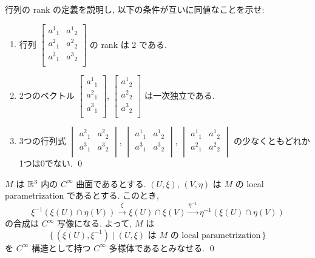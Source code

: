 \documentclass[12pt,twoside]{jarticle}
\def\R{{\Bbb R}} %
\begin{document}
\begin{question}
  行列の rank の定義を説明し, 以下の条件が互いに同値なことを示せ:
  \begin{enumerate}
  \item 行列 %
    \( \displaystyle
    \begin{bmatrix}
      a^1{}_1 & a^1{}_2 \\
      a^2{}_1 & a^2{}_2 \\
      a^3{}_1 & a^3{}_2 \\
    \end{bmatrix}
    \) の rank は 2 である.
  \item 2つのベクトル %
    \(
    \begin{bmatrix}
      a^1{}_1 \\
      a^2{}_1 \\
      a^3{}_1 \\
    \end{bmatrix}
    \), %
    \(
    \begin{bmatrix}
      a^1{}_2 \\
      a^2{}_2 \\
      a^3{}_2 \\
    \end{bmatrix}
    \) %
    は一次独立である.
  \item 3つの行列式 %
    \(
    \begin{vmatrix}
      a^2{}_1 & a^2{}_2 \\
      a^3{}_1 & a^3{}_2 \\
    \end{vmatrix}
    \), %
    \(
    \begin{vmatrix}
      a^1{}_1 & a^1{}_2 \\
      a^3{}_1 & a^3{}_2 \\
    \end{vmatrix}
    \), %
    \(
    \begin{vmatrix}
      a^1{}_1 & a^1{}_2 \\
      a^2{}_1 & a^2{}_2 \\
    \end{vmatrix}
    \) %
    の少なくともどれか1つは0でない.
  \qed
  \end{enumerate}
\end{question}

\begin{question}
  $M$ は $\R^3$ 内の $C^\infty$ 曲面であるとする. %
  $(U,\xi)$, $(V,\eta)$ は $M$ の local parametrization であるとする. 
  このとき, 
  \[
    \xi^{-1}(\xi(U)\cap\eta(V))
    \overset{\xi}\longrightarrow
    \xi(U)\cap\xi(V)
    \overset{\eta^{-1}}\longrightarrow
    \eta^{-1}(\xi(U)\cap\eta(V))
  \]
  の合成は $C^\infty$ 写像になる. よって, $M$ は
  \[
    \{\,
      (\xi(U), \xi^{-1})
    \mid
      \text{$(U,\xi)$ は $M$ の local parametrization}
    \,\}
  \]
  を $C^\infty$ 構造として持つ $C^\infty$ 多様体であるとみなせる.
  \qed
\end{question}
\end{document}
